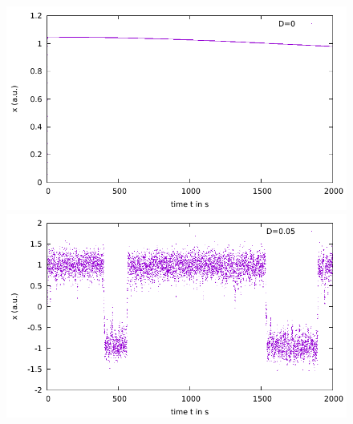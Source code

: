 \documentclass[10pt,fleqn,%
reqno,a4paper]{article}
\begin{document}
\begin{figure}[htpb]
	  \begin{minipage}[b]{0.5\linewidth}
		\includegraphics[width=\linewidth]{gnuplot_pictures/final_pictures/Data_plot_D0.pdf} 
	\end{minipage} 
	  \begin{minipage}[b]{0.5\linewidth}
	\includegraphics[width=\linewidth]{gnuplot_pictures/final_pictures/Data_plot_D0p05.pdf} 


\end{minipage}
\end{figure}
\end{document}
